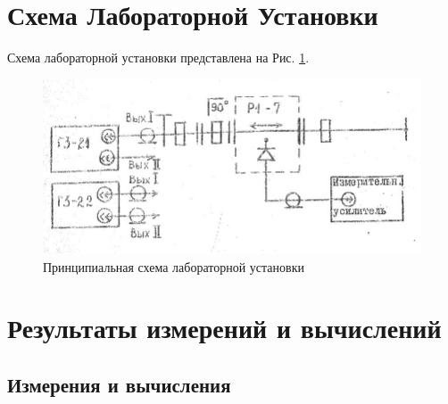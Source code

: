 \documentclass[11pt,a4paper,oneside, reqno]{amsproc}
\begin{document}
\section{Схема Лабораторной Установки}
Схема лабораторной установки представлена на Рис. \ref{fig:scheme}.
\begin{figure}[h!]
    \begin{center}
        \includegraphics[width=\textwidth]{scheme.jpg}
    \end{center}
    \vspace{-20pt}
    \caption{Принципиальная схема лабораторной установки}
    \label{fig:scheme}
\end{figure}

\newpage
\section{Результаты измерений и вычислений}
\subsection{Измерения и вычисления}
\end{document}
